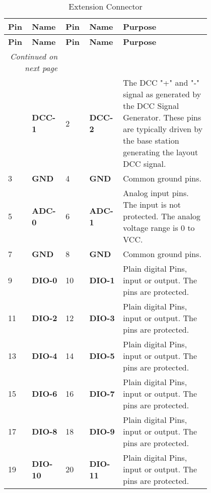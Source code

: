 \begin{center}
    \begin{longtable}{@{}|p{0.1\linewidth}|p{0.1\linewidth}|p{0.1\linewidth}|p{0.1\linewidth}|p{0.4\linewidth}|@{}}
        \caption{Extension Connector} \\
        \toprule
        \textbf{Pin} & \textbf{Name} & \textbf{Pin} & \textbf{Name} & \textbf{Purpose} \\
        \midrule
        \endfirsthead
        \toprule
        \textbf{Pin} & \textbf{Name} & \textbf{Pin} & \textbf{Name} & \textbf{Purpose} \\
        \midrule
        \endhead
        \midrule
        \multicolumn{2}{r}{\textit{Continued on next page}} \\
        \midrule
        \endfoot
        \bottomrule
        \endlastfoot
        1 & \textbf{DCC-1} & 2 & \textbf{DCC-2} & The DCC "+" and "-" signal as generated by the DCC Signal Generator. These pins are typically driven by the base station generating the layout DCC signal.\\
        \midrule
        3 & \textbf{GND} & 4 & \textbf{GND} & Common ground pins. \\
        \midrule
        5 & \textbf{ADC-0} & 6 & \textbf{ADC-1} & Analog input pins. The input is not protected. The analog voltage range is 0 to VCC. \\
        \midrule
        7 & \textbf{GND} & 8 & \textbf{GND} & Common ground pins. \\
        \midrule
        9 & \textbf{DIO-0} & 10 & \textbf{DIO-1} & Plain digital Pins, input or output. The pins are protected. \\
        \midrule
        11 & \textbf{DIO-2} & 12 & \textbf{DIO-3} & Plain digital Pins, input or output. The pins are protected. \\
        \midrule
        13 & \textbf{DIO-4} & 14 & \textbf{DIO-5} & Plain digital Pins, input or output. The pins are protected. \\
        \midrule
        15 & \textbf{DIO-6} & 16 & \textbf{DIO-7} & Plain digital Pins, input or output. The pins are protected. \\
        \midrule
        17 & \textbf{DIO-8} & 18 & \textbf{DIO-9} & Plain digital Pins, input or output. The pins are protected. \\
        \midrule
        19 & \textbf{DIO-10} & 20 & \textbf{DIO-11} & Plain digital Pins, input or output. The pins are protected. \\
        \midrule

\end{longtable}
\end{center}
